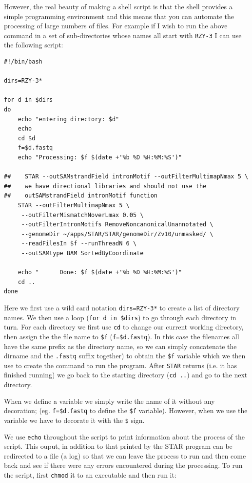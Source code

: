 \documentclass[11pt]{article}
\begin{document}
However, the real beauty of making a shell script is that the shell provides
a simple programming environment and this means that you can automate the
processing of large numbers of files. For example if I wish to run the above
command in a set of sub-directories whose names all start with \texttt{RZY-3} I can
use the following script:

\begin{verbatim}
#!/bin/bash

dirs=RZY-3*

for d in $dirs
do
    echo "entering directory: $d"
    echo 
    cd $d
    f=$d.fastq
    echo "Processing: $f $(date +'%b %D %H:%M:%S')" 

##    STAR --outSAMstrandField intronMotif --outFilterMultimapNmax 5 \
##    we have directional libraries and should not use the 
##    outSAMstrandField intronMotif function
    STAR --outFilterMultimapNmax 5 \
	 --outFilterMismatchNoverLmax 0.05 \
	 --outFilterIntronMotifs RemoveNoncanonicalUnannotated \
	 --genomeDir ~/apps/STAR/STAR/genomeDir/Zv10/unmasked/ \
	 --readFilesIn $f --runThreadN 6 \
	 --outSAMtype BAM SortedByCoordinate

    echo "      Done: $f $(date +'%b %D %H:%M:%S')" 
    cd ..
done
\end{verbatim}

Here we first use a wild card notation \texttt{dirs=RZY-3*} to create a list of
directory names. We then use a loop (\texttt{for d in \$dirs}) to go through each
directory in turn. For each directory we first use \texttt{cd} to change our current
working directory, then assign the the file name to \texttt{\$f} (\texttt{f=\$d.fastq}). In this case
the filenames all have the same prefix as the directory name, so we can
simply concatenate the dirname and the \texttt{.fastq} suffix together) to obtain the \texttt{\$f}
variable which we then use to create the command to run the program. After \texttt{STAR} returns
(i.e. it has finished running) we go back to the starting directory (\texttt{cd ..})
and go to the next directory.

When we define a variable we simply write the name of it without any
decoration; (eg. \texttt{f=\$d.fastq} to define the \texttt{\$f} variable). However, when we
use the variable we have to decorate it with the \texttt{\$} sign.

We use \texttt{echo} throughout the script to print
information about the process of the script. This ouput, in addition to that
printed by the STAR program can be redirected to a file (a log) so that we
can leave the process to run and then come back and see if there were any
errors encountered during the processing. To run the script, first \texttt{chmod} it
to an executable and then run it:
\end{document}
